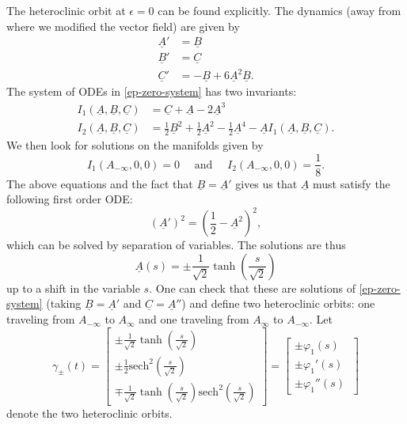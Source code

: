 The heteroclinic orbit at \(\epsilon = 0\) can be found explicitly. The dynamics (away from where we modified the vector field) are given by
\begin{equation}\label{ep-zero-system}
	\begin{aligned}
		\underline A ' &= \underline B \\
		\underline B' &= \underline C \\
		\underline C' &= - \underline B + 6 \underline A^2 \underline B.
	\end{aligned}
\end{equation}
The system of ODEs in \cref{ep-zero-system} has two invariants:
\begin{align*}
	I_1(\underline A, \underline B, \underline C) &= \underline C + \underline A - 2 \underline A^3 \\
	I_2(\underline A, \underline B, \underline C) &= \frac 1 2 \underline B^2 + \frac 12 \underline A^2 - \frac 1 2 \underline A^4 - \underline A I_1(\underline A, \underline B, \underline C).
\end{align*}
We then look for solutions on the manifolds given by
\begin{equation*}
	I_1(A_{-\infty}, 0, 0) = 0 \quad \text{ and } \quad I_2(A_{-\infty}, 0, 0) = \frac 1 8.
\end{equation*}
The above equations and the fact that \(\underline B = \underline A'\) gives us that \(\underline A\) must satisfy the following first order ODE:
\begin{equation*}
	(\underline A')^2 = \left(\frac  1 2 - \underline A^2\right)^2,
\end{equation*}
which can be solved by separation of variables. The solutions are thus
\begin{equation*}
	\underline A(s) = \pm \frac{1}{\sqrt 2} \tanh\left(\frac s {\sqrt 2} \right)
\end{equation*}
up to a shift in the variable \(s\). One can check that these are solutions of \cref{ep-zero-system} (taking \(\underline B = \underline A'\) and \(\underline C = \underline A''\)) and define two heteroclinic orbits: one traveling from \(A_{-\infty}\) to \(A_\infty\) and one traveling from \(A_{\infty}\) to \(A_{-\infty}\). Let
\begin{equation}\label{heteroclinic-orbit-at-zero}
	\gamma_{\pm} (t) = \begin{bmatrix}
		 \pm\frac 1 {\sqrt 2} \tanh\left(\frac s {\sqrt 2}\right) \\
		 \pm\frac 1 2 \mathrm{sech}^2\left( \frac s {\sqrt 2}\right) \\
		 \mp\frac{1}{\sqrt 2 }\tanh\left(\frac s {\sqrt 2 }\right)\mathrm{sech}^2\left(\frac {s}{\sqrt 2}\right)
	\end{bmatrix} = \begin{bmatrix}
	\pm \varphi_1(s)\\
	\pm \varphi_1'(s) \\
	\pm \varphi_1''(s) \
\end{bmatrix}
\end{equation}
denote the two heteroclinic orbits.

